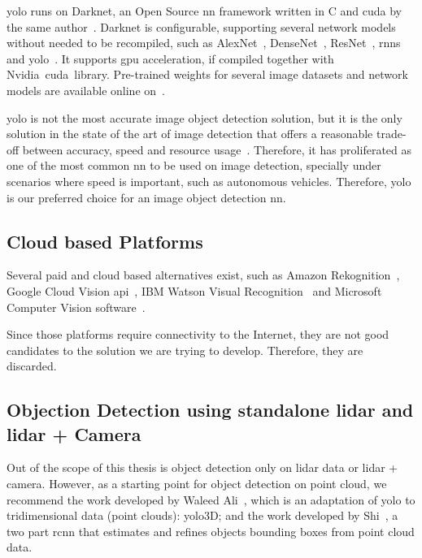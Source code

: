 \ac{yolo} runs on Darknet, an Open Source \ac{nn} framework written in C and \ac{cuda} by the same author~\cite{Redmon2013}. Darknet is configurable, supporting several network models without needed to be recompiled, such as AlexNet~\cite{Krizhevsky2007}, DenseNet~\cite{Huang2017}, ResNet~\cite{He2016}, \acp{rnn}~\cite{Cleeremans1989} and \ac{yolo}~\cite{Redmon2016}. It supports \ac{gpu} acceleration, if compiled together with Nvidia\cp~\ac{cuda}\texttrademark~library. Pre-trained weights for several image datasets and network models are available online on~\cite{Redmon2013}. 

\ac{yolo} is not the most accurate image object detection solution, but it is the only solution in the state of the art of image detection that offers a reasonable trade-off between accuracy, speed and resource usage~\cite{Redmon2018}. Therefore, it has proliferated as one of the most common \ac{nn} to be used on image detection, specially under scenarios where speed is important, such as autonomous vehicles. Therefore, \ac{yolo} is our preferred choice for an image object detection \ac{nn}.

\subsection{Cloud based Platforms}
Several paid and cloud based alternatives exist, such as Amazon Rekognition~\cite{awsRekognition}, Google Cloud Vision \ac{api}~\cite{googlevision}, IBM Watson Visual Recognition~\cite{watson} and Microsoft Computer Vision software~\cite{azurecv}. 

Since those platforms require connectivity to the Internet, they are not good candidates to the solution we are trying to develop. Therefore, they are discarded.

\subsection{Objection Detection using standalone \acs{lidar} and \acs{lidar} + Camera}
Out of the scope of this thesis is object detection only on \ac{lidar} data or \ac{lidar} + camera. However, as a starting point for object detection on point cloud, we recommend the work developed by Waleed Ali\etal~\cite{Ali2019}, which is an adaptation of \ac{yolo} to tridimensional data (point clouds): \ac{yolo}3D; and the work developed by Shi\etal~\cite{Shi2018}, a two part \ac{rcnn} that estimates and refines objects bounding boxes from point cloud data.

